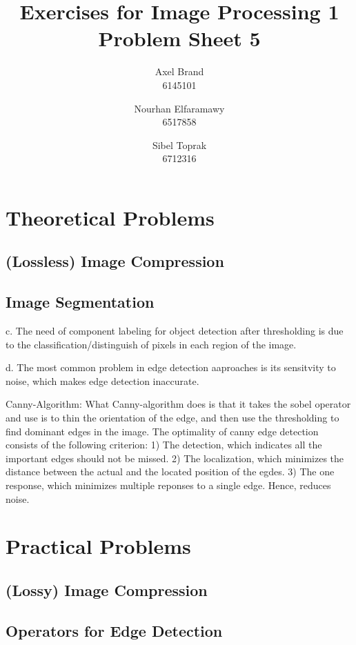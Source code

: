 \documentclass[a4paper,twocolumn]{article}
\title{\textbf{Exercises for Image Processing 1}\\Problem Sheet 5}
\author{Axel Brand\\6145101 \and Nourhan Elfaramawy\\6517858 \and Sibel Toprak\\6712316}
\begin{document}
	\maketitle
	
	\section{Theoretical Problems}

	

	
	\subsection{(Lossless) Image Compression}
	
	\subsection{Image Segmentation}
	
	c. The need of component labeling for object detection after thresholding is due to the classification/distinguish of pixels in each region of the image.
	
	d. The most common problem in edge detection aaproaches is its sensitvity to noise, which makes edge detection inaccurate.
	
	Canny-Algorithm:
	What Canny-algorithm does is that it takes the sobel operator and use is to thin the orientation of the edge, and then use the thresholding to find dominant edges in the image.
	The optimality of canny edge detection consists of the following criterion:
	1) The detection, which indicates all the important edges should not be missed.
	2) The localization, which minimizes the distance between the actual and the located position of the egdes.
	3) The one response, which minimizes multiple reponses to a single edge. Hence, reduces noise.
	
	
	\section{Practical Problems}
	
	\subsection{(Lossy) Image Compression}
	
	\subsection{Operators for Edge Detection}
	
\end{document}
